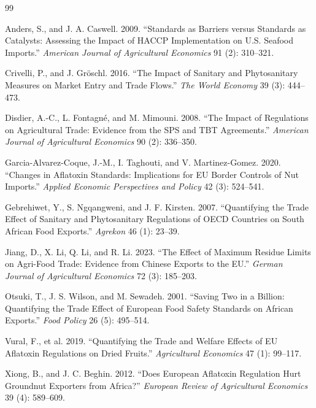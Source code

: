 \documentclass[12pt]{article}
\begin{document}
\newpage
\begin{thebibliography}{99}

Anders, S., and J. A. Caswell. 2009. 
``Standards as Barriers versus Standards as Catalysts: Assessing the Impact of HACCP Implementation on U.S. Seafood Imports.'' 
\textit{American Journal of Agricultural Economics} 91 (2): 310--321.

Crivelli, P., and J. Gr\"{o}schl. 2016. 
``The Impact of Sanitary and Phytosanitary Measures on Market Entry and Trade Flows.'' 
\textit{The World Economy} 39 (3): 444--473.

Disdier, A.-C., L. Fontagn\'{e}, and M. Mimouni. 2008. 
``The Impact of Regulations on Agricultural Trade: Evidence from the SPS and TBT Agreements.'' 
\textit{American Journal of Agricultural Economics} 90 (2): 336--350.

Garcia-Alvarez-Coque, J.-M., I. Taghouti, and V. Martinez-Gomez. 2020. 
``Changes in Aflatoxin Standards: Implications for EU Border Controls of Nut Imports.'' 
\textit{Applied Economic Perspectives and Policy} 42 (3): 524--541. 

Gebrehiwet, Y., S. Ngqangweni, and J. F. Kirsten. 2007. 
``Quantifying the Trade Effect of Sanitary and Phytosanitary Regulations of OECD Countries on South African Food Exports.'' 
\textit{Agrekon} 46 (1): 23--39.

Jiang, D., X. Li, Q. Li, and R. Li. 2023. 
``The Effect of Maximum Residue Limits on Agri-Food Trade: Evidence from Chinese Exports to the EU.'' 
\textit{German Journal of Agricultural Economics} 72 (3): 185--203.

Otsuki, T., J. S. Wilson, and M. Sewadeh. 2001. 
``Saving Two in a Billion: Quantifying the Trade Effect of European Food Safety Standards on African Exports.'' 
\textit{Food Policy} 26 (5): 495--514.

Vural, F., et al. 2019. 
``Quantifying the Trade and Welfare Effects of EU Aflatoxin Regulations on Dried Fruits.'' 
\textit{Agricultural Economics} 47 (1): 99--117.

Xiong, B., and J. C. Beghin. 2012. 
``Does European Aflatoxin Regulation Hurt Groundnut Exporters from Africa?'' 
\textit{European Review of Agricultural Economics} 39 (4): 589--609.

\end{thebibliography}
\end{document}
